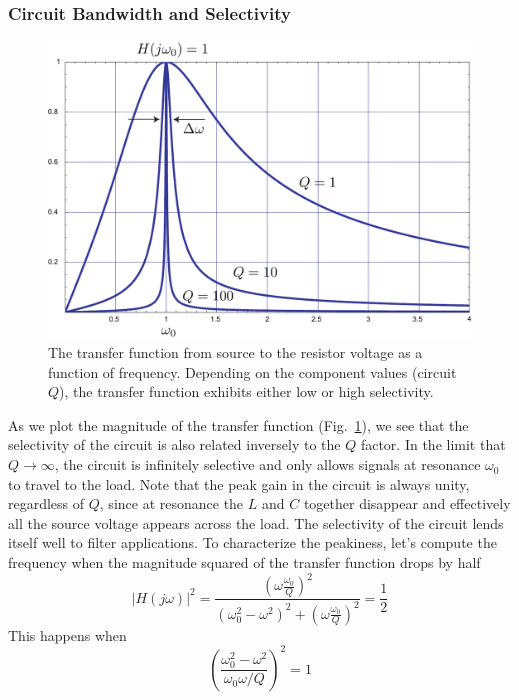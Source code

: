 \subsubsection{Circuit Bandwidth and Selectivity}
\begin{figure}
\centering
\includegraphics[width=.65\columnwidth]{transferrlc}
\caption{The transfer function from source to the resistor voltage as a function of frequency.  Depending on the component values (circuit $Q$), the transfer function exhibits either low or high selectivity.} \label{fig:transferrlc}
\end{figure}
As we plot the magnitude of the transfer function (Fig.~\ref{fig:transferrlc}), we see that the selectivity of the circuit is also related inversely to the $Q$ factor.  
In the limit that $Q \rightarrow \infty$, the circuit is infinitely selective and only allows signals at resonance $\omega_0$ to travel to the load.  Note that the peak gain in the circuit is always unity, regardless of $Q$, since at resonance the $L$ and $C$ together disappear and effectively all the source voltage appears across the load.  The selectivity of the circuit lends itself well to filter applications.  To characterize the peakiness, let's compute the frequency when the magnitude squared of the transfer function drops by half
    \begin{equation}
        | H(j\omega)|^2 = \frac{ \left(\omega \frac{\omega_0}{Q} \right)^2}{\left( \omega_0^2 - \omega^2\right)^2 + \left( \omega \frac{\omega_0}{Q}\right)^2} = \frac{1}{2}
    \end{equation}
This happens when
    \begin{equation}
        \left( \frac{\omega_0^2 - \omega^2}{\omega_0\omega / Q}\right)^2 = 1
    \end{equation}

